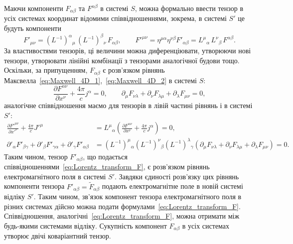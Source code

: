 Маючи компоненти $F_{\alpha\beta}$ та $F^{\alpha\beta}$ в системі $S$, можна формально ввести тензор в усіх системах координат відомими співвідношеннями, зокрема, в системі $S'$ це будуть компоненти
\begin{equation}\label{eq:Lorentz_transform_F}
    F'_{\mu\nu} = (L^{-1})^{\alpha}{}_{\mu}\,(L^{-1})^{\beta}{}_{\nu}\,F_{\alpha\beta},
    \qquad
    F'^{\mu\nu} = \eta^{\mu\alpha}\eta^{\nu\beta}F'_{\alpha\beta}
    = L^{\mu}{}_{\alpha}\,L^{\nu}{}_{\beta}\,F^{\alpha\beta}.
\end{equation}
За властивостями тензорів, ці величини можна диференціювати, утворюючи нові тензори, утворювати лінійні комбінації з тензорами аналогічної будови тощо. Оскільки, за припущенням, $F_{\alpha\beta}$ є розв'язком рівнянь Максвелла~\eqref{eq:Maxwell_4D_1},~\eqref{eq:Maxwell_4D_2} в системі $S$:
\begin{equation*}
    \frac{\partial F^{\alpha\nu}}{\partial x^{\nu}} + \frac{4\pi}{c}j^{\alpha} = 0,
    \qquad
    \partial_{\mu}F_{\nu\lambda} + \partial_{\nu}F_{\lambda\mu}
    + \partial_{\lambda}F_{\mu\nu} = 0,
\end{equation*}
аналогічне співвідношення маємо для тензорів в лівій частині рівнянь і в системі $S'$:
\begin{align*}
    \frac{\partial F'^{\mu\nu}}{\partial x'^{\nu}} + \frac{4\pi}{c}J'^{\mu}
    &= L^{\mu}{}_{\alpha}\!\left(\frac{\partial F^{\alpha\nu}}{\partial x^{\nu}}
    + \frac{4\pi}{c}j^{\alpha}\right) = 0, \\
    \partial'_{\alpha}F'_{\beta\gamma} + \partial'_{\beta}F'_{\gamma\alpha}
    + \partial'_{\gamma}F'_{\alpha\beta}
    &= (L^{-1})^{\mu}{}_{\alpha}(L^{-1})^{\nu}{}_{\beta}(L^{-1})^{\lambda}{}_{\gamma}
    \!\left(\partial_{\mu}F_{\nu\lambda} + \partial_{\nu}F_{\lambda\mu}
    + \partial_{\lambda}F_{\mu\nu}\right) = 0.
\end{align*}
Таким чином, тензор $F'_{\alpha\beta}$, що подається співвідношеннями~\eqref{eq:Lorentz_transform_F}, є розв'язком рівнянь електромагнітного поля в системі $S'$. Завдяки єдиності розв'язку цих рівнянь компоненти тензора $F'_{\alpha\beta} = \tilde{F}_{\alpha\beta}$ подають електромагнітне поле в новій системі відліку $S'$. Таким чином, зв'язок компонент тензора електромагнітного поля в різних системах дійсно можна подати формулами~\eqref{eq:Lorentz_transform_F}. Співвідношення, аналогічні~\eqref{eq:Lorentz_transform_F}, можна отримати між будь-якими системами відліку. Сукупність компонент $F_{\alpha\beta}$ в усіх системах утворює двічі коваріантний тензор.


